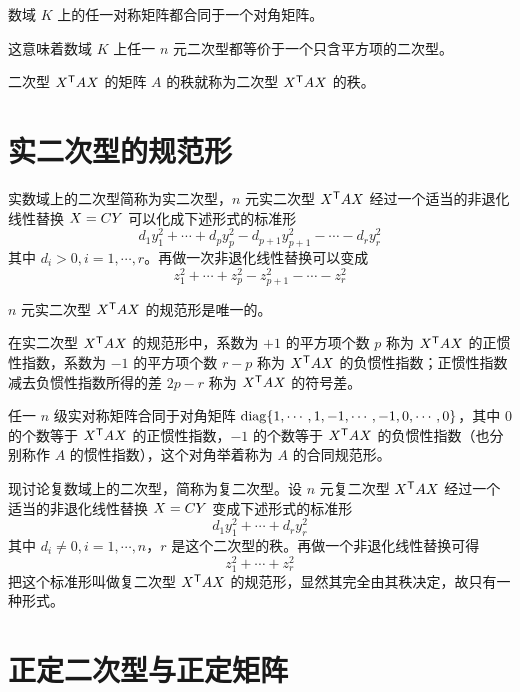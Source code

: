 \begin{theorem}
    数域 $K$ 上的任一对称矩阵都合同于一个对角矩阵。
\end{theorem}

这意味着数域 $K$ 上任一 $n$ 元二次型都等价于一个只含平方项的二次型。

二次型 ${X}^\mathsf{T}AX$ 的矩阵 $A$ 的秩就称为二次型 ${X}^\mathsf{T}AX$ 的秩。

\section{实二次型的规范形}

实数域上的二次型简称为实二次型，$n$ 元实二次型 ${X}^\mathsf{T}AX$ 经过一个适当的非退化线性替换 $X = CY$ 可以化成下述形式的标准形
\[d_1y_1^2+\cdots+d_py_p^2-d_{p+1}y_{p+1}^2-\cdots-d_ry_r^2\]
其中 $d_i>0,i=1,\cdots,r$。再做一次非退化线性替换可以变成
\[z_1^2+\cdots+z_p^2-z_{p+1}^2-\cdots-z_r^2\]

\begin{theorem}
    $n$ 元实二次型 ${X}^\mathsf{T}AX$ 的规范形是唯一的。
\end{theorem}

\begin{definition}
    在实二次型 ${X}^\mathsf{T}AX$ 的规范形中，系数为 $+1$ 的平方项个数 $p$ 称为 ${X}^\mathsf{T}AX$ 的正惯性指数，系数为 $-1$ 的平方项个数 $r-p$ 称为 ${X}^\mathsf{T}AX$ 的负惯性指数；正惯性指数减去负惯性指数所得的差 $2p-r$ 称为 ${X}^\mathsf{T}AX$ 的符号差。
\end{definition}

任一 $n$ 级实对称矩阵合同于对角矩阵 $\operatorname{diag}\{1,\cdots,1,-1,\cdots,-1,0,\cdots,0\}$，其中 $0$ 的个数等于 ${X}^\mathsf{T}AX$ 的正惯性指数，$-1$ 的个数等于 ${X}^\mathsf{T}AX$ 的负惯性指数（也分别称作 $A$ 的惯性指数），这个对角举着称为 $A$ 的合同规范形。

现讨论复数域上的二次型，简称为复二次型。设 $n$ 元复二次型 ${X}^\mathsf{T}AX$ 经过一个适当的非退化线性替换 $X = CY$ 变成下述形式的标准形
\[d_1y_1^2+\cdots+d_ry_r^2\]
其中 $d_i\ne 0,i=1,\cdots,n$，$r$ 是这个二次型的秩。再做一个非退化线性替换可得
\[z_1^2+\cdots+z_r^2\]
把这个标准形叫做复二次型 ${X}^\mathsf{T}AX$ 的规范形，显然其完全由其秩决定，故只有一种形式。

\section{正定二次型与正定矩阵}

